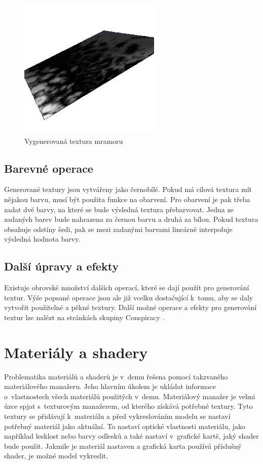 \begin{figure}[h]
    \begin{center}
      \includegraphics[scale=0.65]{fig/marble}
      \caption{Vygenerovaná textura mramoru} 
      \label{MarbleFIG}
    \end{center}
\end{figure}

\section{Barevné operace} \label{texturyBar}
Generované textury jsou vytvářeny jako černobílé.
Pokud má cílová textura mít nějakou barvu, musí být použita funkce na obarvení.
Pro obarvení je pak třeba zadat dvě barvy, na které se bude výsledná textura přebarvovat.
Jedna ze zadaných barev bude nahrazena za černou barvu a druhá za bílou. 
Pokud textura obsahuje odstíny šedi, pak se mezi zadanými barvami lineárně interpoluje výsledná hodnota barvy.

\section{Další úpravy a efekty} \label{texturyEfe}
Existuje obrovské množství dalších operací, které se dají použít pro generování textur.
Výše popsané operace jsou ale již vcelku dostačující k~tomu, aby se daly vytvořit použitelné a pěkné textury.
Další možné operace a efekty pro generování textur lze nalézt na stránkách skupiny Conspiracy \cite{texturesCON}.


\chapter{Materiály a shadery}
Problematika materiálů a shaderů je v~demu řešena pomocí takzvaného materiálového manažeru.
Jeho hlavním úkolem je ukládat informace o~vlastnostech všech materiálů použitých v~demu.
Materiálový manažer je velmi úzce spjat s~texturovým manažerem, od kterého získává potřebné textury.
Tyto textury se přidávají k~materiálu a před vykreslováním modelu se nastaví potřebný materiál jako aktuální.
To nastaví optické vlastnosti materiálu, jako například lesklost nebo barvy odlesků a také nastaví v~grafické kartě, jaký shader bude použit.
Jakmile je materiál nastaven a grafická karta používá příslušný shader, je možné model vykreslit.

